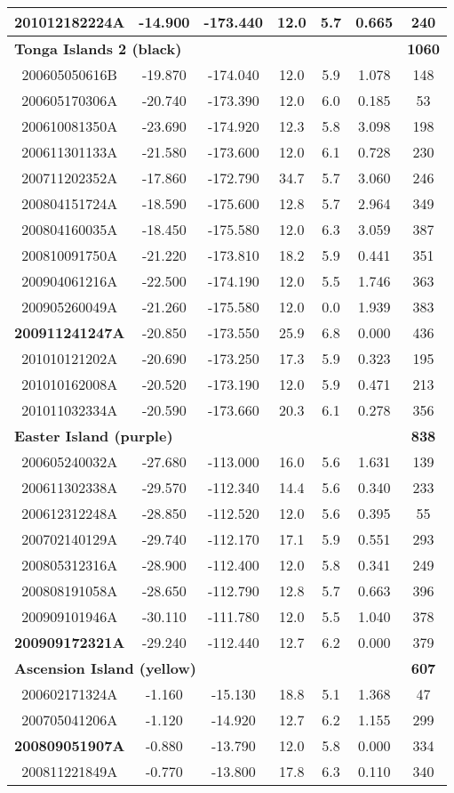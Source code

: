 \documentclass[12pt,oneside]{book}
\begin{document}
\begin{longtable}{ c c c c c c c }
201012182224A &-14.900 &-173.440 &12.0 &5.7 &0.665 &240 \\ \hline 
\multicolumn{3}{l}{\textbf{Tonga Islands 2 (black)}} & & & &\textbf{1060} \\
200605050616B &-19.870 &-174.040 &12.0 &5.9 &1.078 &148 \\
200605170306A &-20.740 &-173.390 &12.0 &6.0 &0.185 &53 \\
200610081350A &-23.690 &-174.920 &12.3 &5.8 &3.098 &198 \\
200611301133A &-21.580 &-173.600 &12.0 &6.1 &0.728 &230 \\
200711202352A &-17.860 &-172.790 &34.7 &5.7 &3.060 &246 \\
200804151724A &-18.590 &-175.600 &12.8 &5.7 &2.964 &349 \\
200804160035A &-18.450 &-175.580 &12.0 &6.3 &3.059 &387 \\
200810091750A &-21.220 &-173.810 &18.2 &5.9 &0.441 &351 \\
200904061216A &-22.500 &-174.190 &12.0 &5.5 &1.746 &363 \\
200905260049A &-21.260 &-175.580 &12.0 &0.0 &1.939 &383 \\
\textbf{200911241247A} &-20.850 &-173.550 &25.9 &6.8 &0.000 &436 \\
201010121202A &-20.690 &-173.250 &17.3 &5.9 &0.323 &195 \\
201010162008A &-20.520 &-173.190 &12.0 &5.9 &0.471 &213 \\
201011032334A &-20.590 &-173.660 &20.3 &6.1 &0.278 &356 \\ \hline 
\multicolumn{3}{l}{\textbf{Easter Island (purple)}} & & & &\textbf{838} \\
200605240032A &-27.680 &-113.000 &16.0 &5.6 &1.631 &139 \\
200611302338A &-29.570 &-112.340 &14.4 &5.6 &0.340 &233 \\
200612312248A &-28.850 &-112.520 &12.0 &5.6 &0.395 &55 \\
200702140129A &-29.740 &-112.170 &17.1 &5.9 &0.551 &293 \\
200805312316A &-28.900 &-112.400 &12.0 &5.8 &0.341 &249 \\
200808191058A &-28.650 &-112.790 &12.8 &5.7 &0.663 &396 \\
200909101946A &-30.110 &-111.780 &12.0 &5.5 &1.040 &378 \\
\textbf{200909172321A} &-29.240 &-112.440 &12.7 &6.2 &0.000 &379 \\ \hline 
\multicolumn{3}{l}{\textbf{Ascension Island (yellow)}} & & & &\textbf{607} \\
200602171324A &-1.160 &-15.130 &18.8 &5.1 &1.368 &47 \\
200705041206A &-1.120 &-14.920 &12.7 &6.2 &1.155 &299 \\
\textbf{200809051907A} &-0.880 &-13.790 &12.0 &5.8 &0.000 &334 \\
200811221849A &-0.770 &-13.800 &17.8 &6.3 &0.110 &340 \\ \hline 
\end{longtable}
\end{document}
